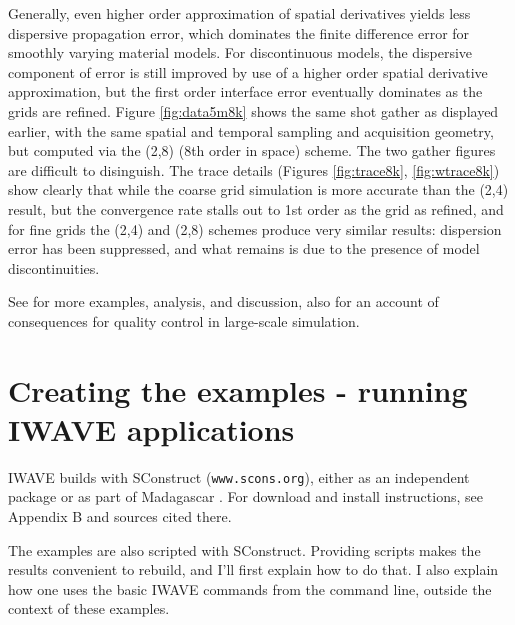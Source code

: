 Generally, even higher order approximation of spatial derivatives
yields less dispersive propagation error, which dominates the finite
difference error for smoothly varying material models. For
discontinuous models, the dispersive component of error is still
improved by use of a higher order spatial derivative approximation,
but the first order interface error eventually dominates as the grids
are refined. Figure \ref{fig:data5m8k} shows the same shot gather as
displayed earlier, with the same spatial and temporal sampling and
acquisition geometry, but computed via the (2,8) (8th order in space)
scheme. The two gather figures are difficult to disinguish. The trace
details (Figures \ref{fig:trace8k}, \ref{fig:wtrace8k}) show clearly
that while the coarse grid simulation is more accurate than the (2,4)
result, but the convergence rate stalls out to 1st order as the grid
as refined, and for fine grids the (2,4) and (2,8) schemes produce
very similar results: dispersion error has been suppressed, and what
remains is due to the presence of model discontinuities.

See
\cite[]{SymesVdovina:09} for more examples, analysis, and discussion,
also \cite[]{FehlerKeliher:2011} for an account of consequences for quality control in
large-scale simulation.

\section{Creating the examples - running IWAVE applications}
IWAVE builds with SConstruct ({\tt www.scons.org}), either as an
independent package or as part of Madagascar \cite[]{Madagascar}. For
download and install instructions, see Appendix B and sources cited
there.

The examples are also scripted with SConstruct. Providing scripts
makes the results convenient to rebuild, and I'll first explain how to do
that. I also explain how one uses the basic IWAVE commands from
the command line, outside the context of these examples.

